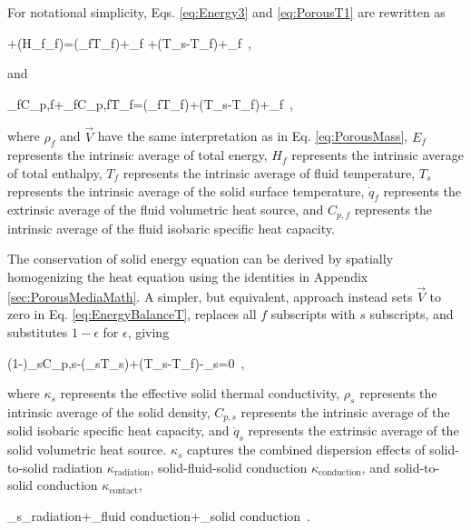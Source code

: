 \noindent For notational simplicity, Eqs. \eqref{eq:Energy3} and \eqref{eq:PorousT1} are rewritten as

\beq
\label{eq:EnergyBalance7}
+\nabla\cdot(\epsilon H_f\rho_f)=\nabla\cdot(\kappa_f\nabla T_f)+\epsilon\rho_f \cdot{}+\alpha(T_s-T_f)+_f\ ,
\eeq

\noindent and

\beq
\label{eq:EnergyBalanceT}
\epsilon\rho_fC_{p,f}+\epsilon\rho_fC_{p,f}\cdot\nabla T_f=\nabla\cdot(\kappa_f\nabla T_f)+\alpha(T_s-T_f)+_f\ ,
\eeq

\noindent where \(\rho_f\) and \(\vec{V}\) have the same interpretation as in Eq. \eqref{eq:PorousMass}, \(E_f\) represents the intrinsic average of total energy, \(H_f\) represents the intrinsic average of total enthalpy, \(T_f\) represents the intrinsic average of fluid temperature, \(T_s\) represents the intrinsic average of the solid surface temperature, \(\dot{q}_f\) represents the extrinsic average of the fluid volumetric heat source, and \(C_{p,f}\) represents the intrinsic average of the fluid isobaric specific heat capacity.

The conservation of solid energy equation can be derived by spatially homogenizing the heat equation using the identities in Appendix \ref{sec:PorousMediaMath}. A simpler, but equivalent, approach instead sets \(\vec{V}\) to zero in Eq. \eqref{eq:EnergyBalanceT}, replaces all \(f\) subscripts with \(s\) subscripts, and substitutes \(1-\epsilon\) for \(\epsilon\), giving

\beq
\label{eq:SolidPorous}
(1-\epsilon)\rho_sC_{p,s}-\nabla\cdot(\kappa_s\nabla T_s)+\alpha(T_s-T_f)-_s=0\ ,
\eeq

\noindent where \(\kappa_s\) represents the effective solid thermal conductivity, \(\rho_s\) represents the intrinsic average of the solid density, \(C_{p,s}\) represents the intrinsic average of the solid isobaric specific heat capacity, and \(\dot{q}_s\) represents the extrinsic average of the solid volumetric heat source. \(\kappa_s\) captures the combined dispersion effects of solid-to-solid radiation \(\kappa_\text{radiation}\), solid-fluid-solid conduction \(\kappa_\text{conduction}\), and solid-to-solid conduction \(\kappa_\text{contact}\),

\beq
\label{eq:Kappa}
\kappa_s\equiv\kappa_{\textrm{radiation}}+\kappa_{\textrm{fluid conduction}}+\kappa_{\textrm{solid conduction}}\ .
\eeq

